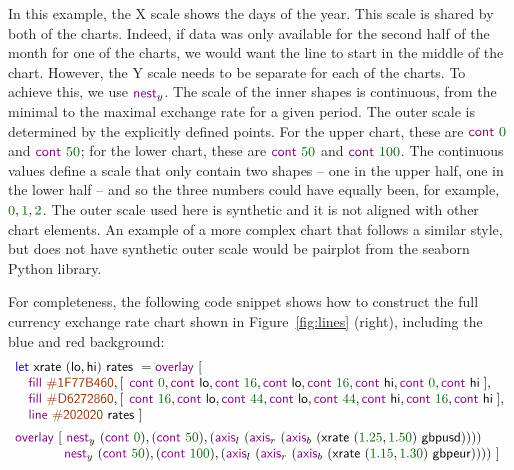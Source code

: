 \documentclass{jfp}
\newcommand{\num}[1]{\textcolor{numclr}{#1}}
\newcommand{\strf}[1]{\textnormal{\textcolor{strclr}{\sffamily #1}}}
\newcommand{\ident}[1]{\textnormal{\textcolor{idclr}{\sffamily #1}}}
\newcommand{\kvd}[1]{\textnormal{\textcolor{kvdclr}{\sffamily #1}}}
\newcommand{\fkvd}[1]{\textnormal{\textcolor{fkvdclr}{\sffamily #1}}}
\begin{document}
\vspace{-0.5em}
\noindent
In this example, the X scale shows the days of the year. This scale is shared by both of the charts.
Indeed, if data was only available for the second half of the month for one of the charts,
we would want the line to start in the middle of the chart. However, the Y scale needs to be
separate for each of the charts. To achieve this, we use $\kvd{nest}_y$. The scale of the inner
shapes is continuous, from the minimal to the maximal exchange rate for a given period. The
outer scale is determined by the explicitly defined points. For the upper chart, these are
$\kvd{cont}~\num{0}$ and $\kvd{cont}~\num{50}$; for the lower chart, these are
$\kvd{cont}~\num{50}$ and $\kvd{cont}~\num{100}$. The continuous values define a scale that only
contain two shapes -- one in the upper half, one in the lower half -- and so the three numbers could
have equally been, for example, $\num{0},\num{1}, \num{2}$. The outer scale used here is
synthetic and it is not aligned with other chart elements. An example of a more complex chart
that follows a similar style, but does not have synthetic outer scale would be pairplot from
the seaborn Python library. %

For completeness, the following code snippet shows how to construct the full currency exchange
rate chart shown in Figure~\ref{fig:lines} (right), including the blue and red background:
%
\begin{equation*}
\begin{array}{l}
\fkvd{let}~\ident{xrate}~(\ident{lo}, \ident{hi})~\ident{rates}~=\kvd{overlay}~[\\
\quad \kvd{fill}~\strf{\#1F77B460}, [\;\,\kvd{cont}~\num{0}, \kvd{cont}~\ident{lo}, \kvd{cont}~\num{16}, \kvd{cont}~\ident{lo}, \kvd{cont}~\num{16}, \kvd{cont}~\ident{hi}, \kvd{cont}~\num{0}, \kvd{cont}~\ident{hi}\;],\\
\quad \kvd{fill}~\strf{\#D6272860}, [\;\,\kvd{cont}~\num{16}, \kvd{cont}~\ident{lo}, \kvd{cont}~\num{44}, \kvd{cont}~\ident{lo}, \kvd{cont}~\num{44}, \kvd{cont}~\ident{hi}, \kvd{cont}~\num{16}, \kvd{cont}~\ident{hi}\;],\\
\quad \kvd{line}~\strf{\#202020}~\ident{rates}~]\\[0.5em]
\kvd{overlay}~[~
\kvd{nest}_y~(\kvd{cont}~\num{0}),(\kvd{cont}~\num{50}), (\kvd{axis}_l~(\kvd{axis}_r~(\kvd{axis}_b~(\ident{xrate}~(\num{1.25}, \num{1.50})~\ident{gbpusd}))))\\
\hspace{3.68em} \kvd{nest}_y~(\kvd{cont}~\num{50}),(\kvd{cont}~\num{100}), (\kvd{axis}_l~(\kvd{axis}_r~(\kvd{axis}_b~(\ident{xrate}~(\num{1.15}, \num{1.30})~\ident{gbpeur}))))~]\\
\end{array}
\end{equation*}
\end{document}
